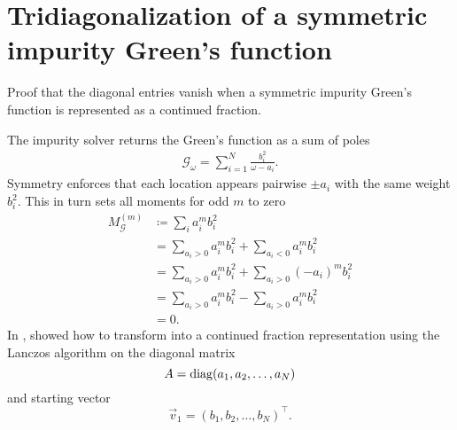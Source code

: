\chapter{Tridiagonalization of a symmetric impurity Green's function}

Proof that the diagonal entries vanish when a symmetric impurity Green's function
is represented as a continued fraction.

The impurity solver returns the Green's function as a sum of poles
\begin{align}
    \mathcal{G}_{\!\omega} = \sum_{i=1}^N \frac{b_i^2}{\omega - a_i}.
    \label{eq:impurity-greens-function}
\end{align}
Symmetry enforces that each location appears pairwise $\pm a_i$
with the same weight $b_i^2$.
This in turn sets all moments for odd $m$ to zero
\begin{align}
    M^{(m)}_{\mathcal{G}}
     & \coloneqq
    \sum_i a_i^m b_i^2                                     \\
     & =
    \sum_{a_i>0} a_i^m b_i^2 + \sum_{a_i<0} a_i^m b_i^2    \\
     & =
    \sum_{a_i>0} a_i^m b_i^2 + \sum_{a_i>0} (-a_i)^m b_i^2 \\
     & =
    \sum_{a_i>0} a_i^m b_i^2 - \sum_{a_i>0} a_i^m b_i^2    \\
     & =
    0.
\end{align}
In \cite[appendix B]{Lu2014}, \citeauthor{Lu2014} showed how to transform
 into a continued fraction representation
using the Lanczos algorithm on the diagonal matrix
\begin{equation}
    A
    =
    \operatorname{diag}(a_1, a_2, \ldots, a_N)
\end{equation}
and starting vector
\begin{equation}
    \vec{v}_1 = (b_1, b_2, \ldots, b_N)^\intercal.
\end{equation}

